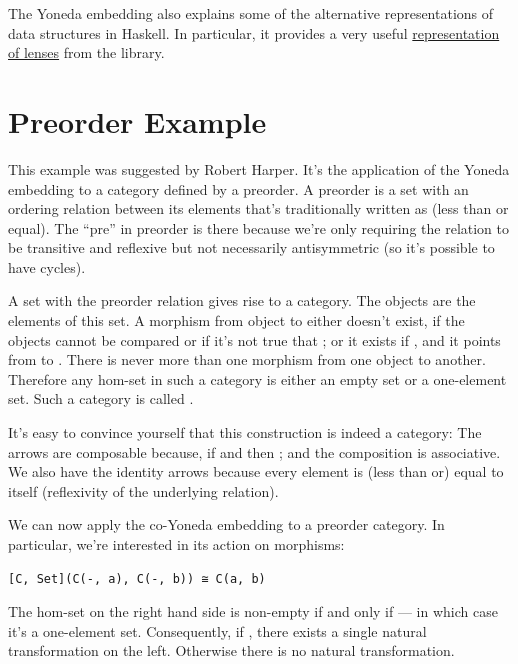 The Yoneda embedding also explains some of the alternative
representations of data structures in Haskell. In particular, it
provides a very useful
\href{https://bartoszmilewski.com/2015/07/13/from-lenses-to-yoneda-embedding/}{representation
of lenses} from the  library.

\section{Preorder Example}\label{preorder-example}

This example was suggested by Robert Harper. It's the application of the
Yoneda embedding to a category defined by a preorder. A preorder is a
set with an ordering relation between its elements that's traditionally
written as \code{\textless{}=} (less than or equal). The ``pre'' in
preorder is there because we're only requiring the relation to be
transitive and reflexive but not necessarily antisymmetric (so it's
possible to have cycles).

A set with the preorder relation gives rise to a category. The objects
are the elements of this set. A morphism from object  to
 either doesn't exist, if the objects cannot be compared or if
it's not true that ; or it exists if
, and it points from  to
. There is never more than one morphism from one object to
another. Therefore any hom-set in such a category is either an empty set
or a one-element set. Such a category is called .

It's easy to convince yourself that this construction is indeed a
category: The arrows are composable because, if
 and  then
; and the composition is associative. We also
have the identity arrows because every element is (less than or) equal
to itself (reflexivity of the underlying relation).

We can now apply the co-Yoneda embedding to a preorder category. In
particular, we're interested in its action on morphisms:

\begin{verbatim}
[C, Set](C(-, a), C(-, b)) ≅ C(a, b)
\end{verbatim}

The hom-set on the right hand side is non-empty if and only if
 --- in which case it's a one-element set.
Consequently, if , there exists a single
natural transformation on the left. Otherwise there is no natural
transformation.

